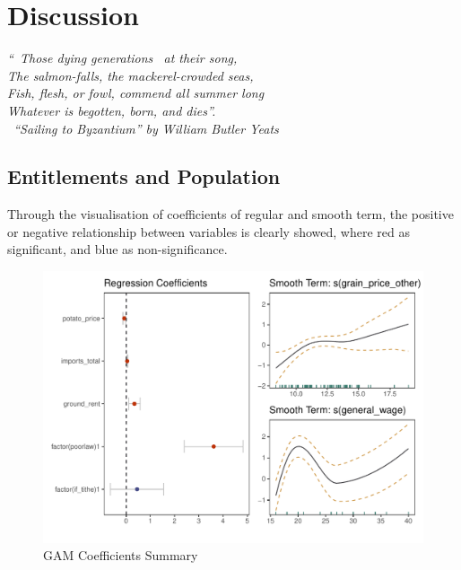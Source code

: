 \chapter{Discussion}

\textit{``\textendash\ Those dying generations \textendash\ at their song,\\
The salmon-falls, the mackerel-crowded seas,\\
Fish, flesh, or fowl, commend all summer long\\
Whatever is begotten, born, and dies''.\\
\textemdash\ ``Sailing to Byzantium'' by William Butler Yeats } \citep{yeats1971sailing}

\vspace{.2cm}

\section{Entitlements and Population}

Through the visualisation of coefficients of regular and smooth term, the positive or negative relationship between variables is clearly showed, where red as significant, and blue as non-significance.

\begin{figure}[h]
    \centering
    \caption{GAM Coefficients Summary}
    \includegraphics[width=.95\textwidth]{../03_outputs/coef.visual.pdf}
\end{figure}
\vspace{-7pt}

